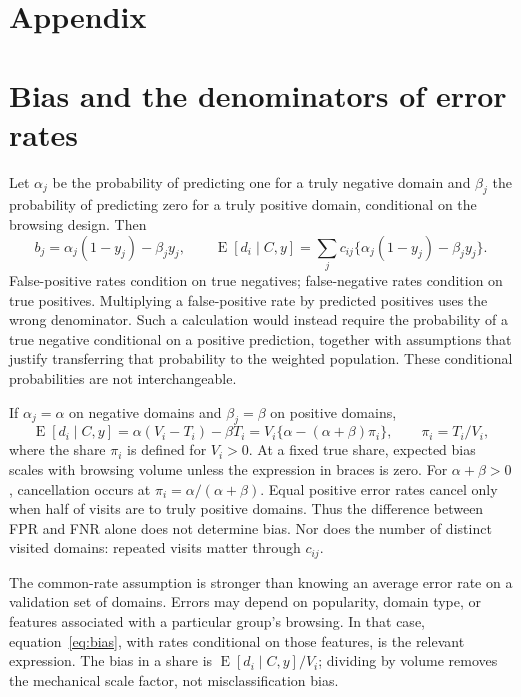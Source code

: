 \documentclass[11pt,letterpaper]{article}
\newcommand{\E}{\operatorname{E}}
\begin{document}
\section*{Appendix}

\FloatBarrier

\FloatBarrier

\FloatBarrier
\section{Bias and the denominators of error rates}\label{app:rates}
Let $\alpha_j$ be the probability of predicting one for a truly negative domain
and $\beta_j$ the probability of predicting zero for a truly positive domain,
conditional on the browsing design. Then
\begin{equation}\label{eq:bias}
 b_j=\alpha_j(1-y_j)-\beta_j y_j,\qquad
 \E[d_i\mid C,y]=\sum_j c_{ij}\{\alpha_j(1-y_j)-\beta_j y_j\}.
\end{equation}
False-positive rates condition on true negatives; false-negative rates condition
on true positives. Multiplying a false-positive rate by predicted positives
uses the wrong denominator. Such a calculation would instead require the
probability of a true negative conditional on a positive prediction, together
with assumptions that justify transferring that probability to the weighted
population. These conditional probabilities are not interchangeable.

If $\alpha_j=\alpha$ on negative domains and $\beta_j=\beta$ on positive domains,
\begin{equation}\label{eq:constantbias}
 \E[d_i\mid C,y]=\alpha(V_i-T_i)-\beta T_i
 =V_i\{\alpha-(\alpha+\beta)\pi_i\},\qquad \pi_i=T_i/V_i,
\end{equation}
where the share $\pi_i$ is defined for $V_i>0$. At a fixed true share, expected
bias scales with browsing volume unless the expression in braces is zero.
For $\alpha+\beta>0$, cancellation occurs at
$\pi_i=\alpha/(\alpha+\beta)$. Equal positive error rates cancel only when
half of visits are to truly positive domains. Thus the difference between
FPR and FNR alone does not determine bias. Nor does the number of distinct
visited domains: repeated visits matter through $c_{ij}$.

The common-rate assumption is stronger than knowing an average error rate on a
validation set of domains. Errors may depend on popularity, domain type, or
features associated with a particular group's browsing. In that case,
equation~\eqref{eq:bias}, with rates conditional on those features, is the
relevant expression. The bias in a share is $\E[d_i\mid C,y]/V_i$; dividing
by volume removes the mechanical scale factor, not misclassification bias.
\end{document}
